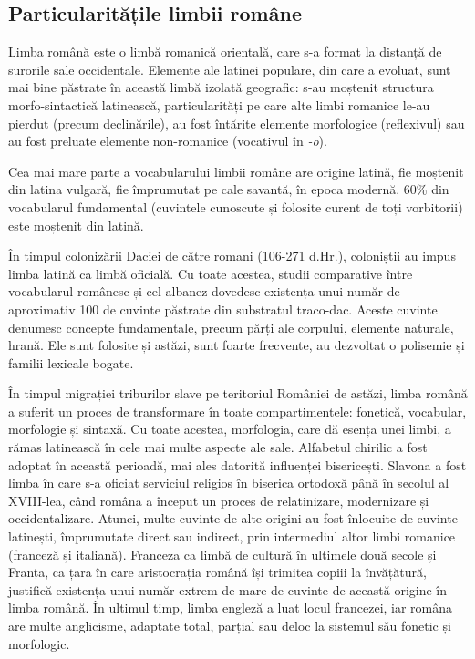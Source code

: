 \documentclass[]{../../metanetpaper}
\begin{document}
\begin{multicols}{2}
\subsection{Particularitățile limbii române}
Limba română este o limbă romanică orientală, care s-a format la distanță de surorile sale occidentale. Elemente ale latinei populare, din care a evoluat, sunt mai bine păstrate în această limbă izolată geografic: s-au moștenit structura morfo-sintactică latinească, particularități pe care alte limbi romanice le-au pierdut (precum declinările), au fost întărite elemente morfologice (reflexivul) sau au fost preluate elemente non-romanice (vocativul în \textit{-o}).

Cea mai mare parte a vocabularului limbii române are origine latină, fie moștenit din latina vulgară, fie împrumutat pe cale savantă, în epoca modernă. 60\% din vocabularul fundamental (cuvintele cunoscute și folosite curent de toți vorbitorii) este moștenit din latină.

În timpul colonizării Daciei de către romani (106-271 d.Hr.), coloniștii au impus limba latină ca limbă oficială. Cu toate acestea, studii comparative între vocabularul românesc și cel albanez dovedesc existența unui număr de aproximativ 100 de cuvinte păstrate din substratul traco-dac. Aceste cuvinte denumesc concepte fundamentale, precum părți ale corpului, elemente naturale, hrană. Ele sunt folosite și astăzi, sunt foarte frecvente, au dezvoltat o polisemie și familii lexicale bogate.

În timpul migrației triburilor slave pe teritoriul României de astăzi, limba română a suferit un proces de transformare în toate compartimentele: fonetică, vocabular, morfologie și sintaxă. Cu toate acestea, morfologia, care dă esența unei limbi, a rămas latinească în cele mai multe aspecte ale sale. Alfabetul chirilic a fost adoptat în această perioadă, mai ales datorită influenței bisericești. Slavona a fost limba în care s-a oficiat serviciul religios în biserica ortodoxă până în secolul al XVIII-lea, când româna a început un proces de relatinizare, modernizare și occidentalizare. Atunci, multe cuvinte de alte origini au fost înlocuite de cuvinte latinești, împrumutate direct sau indirect, prin intermediul altor limbi romanice (franceză și italiană). Franceza ca limbă de cultură în ultimele două secole și Franța, ca țara în care aristocrația română își trimitea copiii la învățătură, justifică existența unui număr extrem de mare de cuvinte de această origine în limba română. În ultimul timp, limba engleză a luat locul francezei, iar româna are multe anglicisme, adaptate total, parțial sau deloc la sistemul său fonetic și morfologic. 


\end{multicols}
\end{document}
